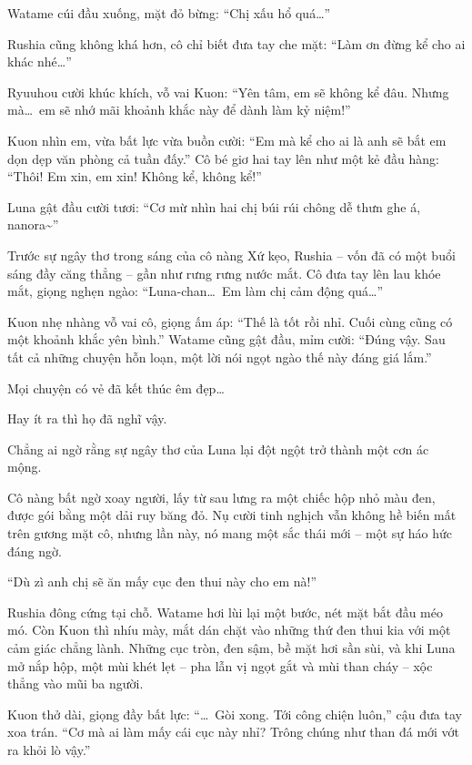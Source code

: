 \documentclass[../main.tex]{subfiles}
\begin{document}
Watame cúi đầu xuống, mặt đỏ bừng: ``Chị xấu hổ quá\dots''

Rushia cũng không khá hơn, cô chỉ biết đưa tay che mặt: ``Làm ơn đừng kể cho ai khác nhé\dots''

Ryuuhou cười khúc khích, vỗ vai Kuon: ``Yên tâm, em sẽ không kể đâu. Nhưng mà\dots\ em sẽ nhớ mãi khoảnh khắc này để dành làm kỷ niệm!''

Kuon nhìn em, vừa bất lực vừa buồn cười: ``Em mà kể cho ai là anh sẽ bắt em dọn dẹp văn phòng cả tuần đấy.'' Cô bé giơ hai tay lên như một kẻ đầu hàng: ``Thôi! Em xin, em xin! Không kể, không kể!''

Luna gật đầu cười tươi: ``Cơ mừ nhìn hai chị búi rúi chông dễ thưn ghe á, nanora\~{}''

Trước sự ngây thơ trong sáng của cô nàng Xứ kẹo, Rushia – vốn đã có một buổi sáng đầy căng thẳng – gần như rưng rưng nước mắt. Cô đưa tay lên lau khóe mắt, giọng nghẹn ngào: ``Luna-chan\dots\ Em làm chị cảm động quá\dots''

Kuon nhẹ nhàng vỗ vai cô, giọng ấm áp: ``Thế là tốt rồi nhỉ. Cuối cùng cũng có một khoảnh khắc yên bình.'' Watame cũng gật đầu, mỉm cười: ``Đúng vậy. Sau tất cả những chuyện hỗn loạn, một lời nói ngọt ngào thế này đáng giá lắm.''

Mọi chuyện có vẻ đã kết thúc êm đẹp\dots

Hay ít ra thì họ đã nghĩ vậy.

Chẳng ai ngờ rằng sự ngây thơ của Luna lại đột ngột trở thành một cơn ác mộng.

Cô nàng bất ngờ xoay người, lấy từ sau lưng ra một chiếc hộp nhỏ màu đen, được gói bằng một dải ruy băng đỏ. Nụ cười tinh nghịch vẫn không hề biến mất trên gương mặt cô, nhưng lần này, nó mang một sắc thái mới – một sự háo hức đáng ngờ.

``Dù zì anh chị sẽ ăn mấy cục đen thui này cho em nà!''


Rushia đông cứng tại chỗ. Watame hơi lùi lại một bước, nét mặt bắt đầu méo mó. Còn Kuon thì nhíu mày, mắt dán chặt vào những thứ đen thui kia với một cảm giác chẳng lành. Những cục tròn, đen sậm, bề mặt hơi sần sùi, và khi Luna mở nắp hộp, một mùi khét lẹt – pha lẫn vị ngọt gắt và mùi than cháy – xộc thẳng vào mũi ba người.

Kuon thở dài, giọng đầy bất lực: ``\dots\ Gòi xong. Tới công chiện luôn,'' cậu đưa tay xoa trán. ``Cơ mà ai làm mấy cái cục này nhỉ? Trông chúng như than đá mới vớt ra khỏi lò vậy.''
\end{document}
